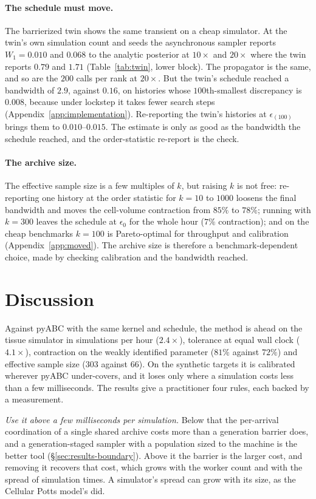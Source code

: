 \documentclass[pdflatex,sn-mathphys-num]{sn-jnl}
\theoremstyle{plain}
\theoremstyle{definition}
\begin{document}
\paragraph{The schedule must move.} The barrierized twin shows the same transient on a cheap simulator. At the twin's own simulation count and seeds the asynchronous sampler reports $W_1=0.010$ and $0.068$ to the analytic posterior at $10\times$ and $20\times$ where the twin reports $0.79$ and $1.71$ (Table~\ref{tab:twin}, lower block). The propagator is the same, and so are the $200$ calls per rank at $20\times$. But the twin's schedule reached a bandwidth of $2.9$, against $0.16$, on histories whose $100$th-smallest discrepancy is $0.008$, because under lockstep it takes fewer search steps (Appendix~\ref{app:implementation}). Re-reporting the twin's histories at $\epsilon_{(100)}$ brings them to $0.010$--$0.015$. The estimate is only as good as the bandwidth the schedule reached, and the order-statistic re-report is the check.

\paragraph{The archive size.} The effective sample size is a few multiples of $k$, but raising $k$ is not free: re-reporting one history at the order statistic for $k=10$ to $1000$ loosens the final bandwidth and moves the cell-volume contraction from $85\%$ to $78\%$; running with $k=300$ leaves the schedule at $\epsilon_0$ for the whole hour ($7\%$ contraction); and on the cheap benchmarks $k=100$ is Pareto-optimal for throughput and calibration (Appendix~\ref{app:moved}). The archive size is therefore a benchmark-dependent choice, made by checking calibration and the bandwidth reached.

\section{Discussion}\label{sec:discussion}
Against pyABC with the same kernel and schedule, the method is ahead on the tissue simulator in simulations per hour ($2.4\times$), tolerance at equal wall clock ($4.1\times$), contraction on the weakly identified parameter ($81\%$ against $72\%$) and effective sample size ($303$ against $66$). On the synthetic targets it is calibrated wherever pyABC under-covers, and it loses only where a simulation costs less than a few milliseconds. The results give a practitioner four rules, each backed by a measurement.

\emph{Use it above a few milliseconds per simulation.} Below that the per-arrival coordination of a single shared archive costs more than a generation barrier does, and a generation-staged sampler with a population sized to the machine is the better tool (\S\ref{sec:results-boundary}). Above it the barrier is the larger cost, and removing it recovers that cost, which grows with the worker count and with the spread of simulation times. A simulator's spread can grow with its size, as the Cellular Potts model's did.
\end{document}
